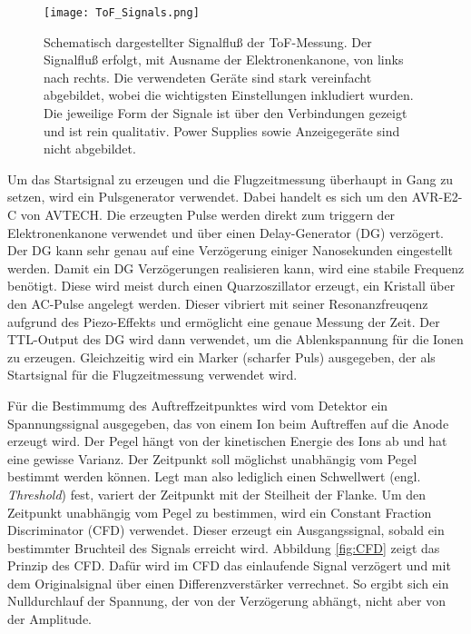 \begin{figure} 
    \centering
    \texttt{[image: ToF\_Signals.png]}
    \caption[Schematisch dargestellter Signalfluß der ToF-Messung]{Schematisch dargestellter Signalfluß der ToF-Messung. Der Signalfluß erfolgt, mit Ausname der Elektronenkanone, von links nach rechts. Die verwendeten Geräte sind stark vereinfacht abgebildet, wobei die wichtigsten Einstellungen inkludiert wurden. Die jeweilige Form der Signale ist über den Verbindungen gezeigt und ist rein qualitativ. Power Supplies sowie Anzeigegeräte sind nicht abgebildet.}
    \label{fig:ToF} 
\end{figure}

Um das Startsignal zu erzeugen und die Flugzeitmessung überhaupt in Gang zu setzen, wird ein Pulsgenerator verwendet. Dabei handelt es sich um den AVR-E2-C von AVTECH. Die erzeugten Pulse werden direkt zum triggern der Elektronenkanone verwendet und über einen Delay-Generator (DG) verzögert. Der DG kann sehr genau auf eine Verzögerung einiger Nanosekunden eingestellt werden. Damit ein DG Verzögerungen realisieren kann, wird eine stabile Frequenz benötigt. Diese wird meist durch einen Quarzoszillator erzeugt, ein Kristall über den AC-Pulse angelegt werden. Dieser vibriert mit seiner Resonanzfreuqenz aufgrund des Piezo-Effekts und ermöglicht eine genaue Messung der Zeit. Der TTL-Output des DG wird dann verwendet, um die Ablenkspannung für die Ionen zu erzeugen. Gleichzeitig wird ein Marker (scharfer Puls) ausgegeben, der als Startsignal für die Flugzeitmessung verwendet wird.

Für die Bestimmumg des Auftreffzeitpunktes wird vom Detektor ein Spannungssignal ausgegeben, das von einem Ion beim Auftreffen auf die Anode erzeugt wird.  Der Pegel hängt von der kinetischen Energie des Ions ab und hat eine gewisse Varianz. Der Zeitpunkt soll möglichst unabhängig vom Pegel bestimmt werden können. Legt man also lediglich einen Schwellwert (engl. \textit{Threshold}) fest, variert der Zeitpunkt mit der Steilheit der Flanke. Um den Zeitpunkt unabhängig vom Pegel zu bestimmen, wird ein Constant Fraction Discriminator (CFD) verwendet. Dieser erzeugt ein Ausgangssignal, sobald ein bestimmter Bruchteil des Signals erreicht wird. Abbildung \ref{fig:CFD} zeigt das Prinzip des CFD. Dafür wird im CFD das einlaufende Signal verzögert und mit dem Originalsignal über einen Differenzverstärker verrechnet. So ergibt sich ein Nulldurchlauf der Spannung, der von der Verzögerung abhängt, nicht aber von der Amplitude. 

